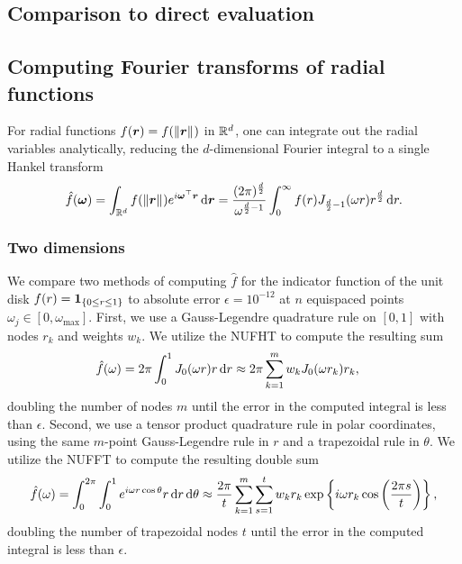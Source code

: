 \subsection{Comparison to direct evaluation}


\subsection{Computing Fourier transforms of radial functions}

For radial functions $f(\bm{r}) = f(\left\Vert\bm{r}\right\Vert_{})$ in $\mathbb{R}^d$, one can integrate
out the radial variables analytically, reducing the $d$-dimensional Fourier
integral to a single Hankel transform
\begin{align} \label{eq:radial-fourier}
    \hat{f}(\bm{\omega}) 
    = \int_{\mathbb{R}^d} f(\left\Vert\bm{r}\right\Vert_{}) e^{i\bm{\omega}^\top \bm{r}} \mathop{}\!\mathrm{d}{\bm{r}}
    = \frac{(2\pi)^{\frac{d}{2}}}{\omega^{\frac{d}{2} - 1}} \int_0^\infty f(r) J_{\frac{d}{2} - 1}(\omega r) r^{\frac{d}{2}} \mathop{}\!\mathrm{d}{r}.
\end{align}

\subsubsection{Two dimensions}

We compare two methods of computing $\hat{f}$ for the indicator function of the
unit disk $f(r) = \bm{1}_{\left\{ 0 \leq r \leq 1\right\}}$ to absolute error $\epsilon = 10^{-12}$
at $n$ equispaced points $\omega_j \in [0, \omega_{\text{max}}]$. First, we use
a Gauss-Legendre quadrature rule on $[0,1]$ with nodes $r_k$ and weights $w_k$.
We utilize the NUFHT to compute the resulting sum
\begin{align}
  \hat{f}(\omega) 
  &= 2\pi\int_0^1 J_0(\omega r) r \mathop{}\!\mathrm{d}{r}
  \approx 2\pi \sum_{k=1}^m w_k J_0(\omega r_k) r_k,
\end{align}
doubling the number of nodes $m$ until the error in the computed integral is
less than $\epsilon$. Second, we use a tensor product quadrature rule in polar
coordinates, using the same $m$-point Gauss-Legendre rule in $r$ and a
trapezoidal rule in $\theta$. We utilize the NUFFT to compute the resulting
double sum
\begin{align}
  \hat{f}(\omega) 
  = \int_0^{2\pi} \int_0^1 e^{i\omega r\cos\theta} r \mathop{}\!\mathrm{d}{r} \mathop{}\!\mathrm{d}{\theta}
  \approx \frac{2\pi}{t} \sum_{k=1}^{m} \sum_{s=1}^{t} w_k r_k \exp\left\{i\omega r_k\cos\left(\frac{2\pi s}{t}\right)\right\},
\end{align}
doubling the number of trapezoidal nodes $t$ until the error in the computed
integral is less than $\epsilon$.

